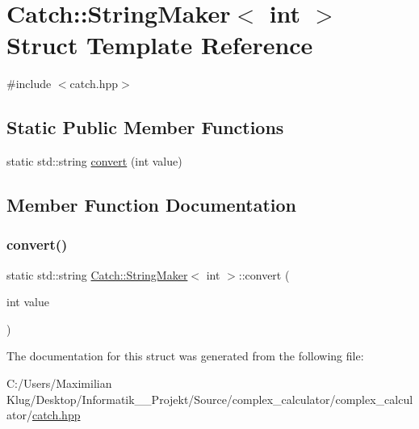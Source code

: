 \hypertarget{struct_catch_1_1_string_maker_3_01int_01_4}{}\section{Catch\+:\+:String\+Maker$<$ int $>$ Struct Template Reference}
\label{struct_catch_1_1_string_maker_3_01int_01_4}


{\ttfamily \#include $<$catch.\+hpp$>$}

\subsection*{Static Public Member Functions}
\begin{DoxyCompactItemize}
\item 
static std\+::string \mbox{\hyperlink{struct_catch_1_1_string_maker_3_01int_01_4_aab096e55fb7283f6ad47b5ca277e22e8}{convert}} (int value)
\end{DoxyCompactItemize}


\subsection{Member Function Documentation}
\mbox{\label{struct_catch_1_1_string_maker_3_01int_01_4_aab096e55fb7283f6ad47b5ca277e22e8}} 
\subsubsection{\texorpdfstring{convert()}{convert()}}
{\footnotesize\ttfamily static std\+::string \mbox{\hyperlink{struct_catch_1_1_string_maker}{Catch\+::\+String\+Maker}}$<$ int $>$\+::convert (\begin{DoxyParamCaption}\item[{int}]{value }\end{DoxyParamCaption})\hspace{0.3cm}{\ttfamily [static]}}



The documentation for this struct was generated from the following file\+:\begin{DoxyCompactItemize}
\item 
C\+:/\+Users/\+Maximilian Klug/\+Desktop/\+Informatik\+\_\+\_\+\+Projekt/\+Source/complex\+\_\+calculator/complex\+\_\+calculator/\mbox{\hyperlink{catch_8hpp}{catch.\+hpp}}\end{DoxyCompactItemize}
